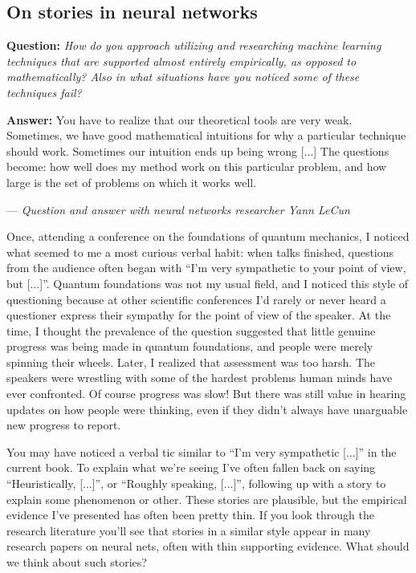 \documentclass[a4paper,twoside,10pt]{book}
\begin{document}
\subsection*{On stories in neural networks}
\begin{adjustwidth}{1.5cm}{0.5cm}
\textbf{Question:} \textit{How do you approach utilizing and researching machine learning techniques that are supported almost entirely empirically, as opposed to mathematically? Also in what situations have you noticed some of these techniques fail?}

\noindent\textbf{Answer:} You have to realize that our theoretical tools are very weak. Sometimes, we have good mathematical intuitions for why a particular technique should work. Sometimes our intuition ends up being wrong [...] The questions become: how well does my method work on this particular problem, and how large is the set of problems on which it works well.

--- \textit{Question and answer with neural networks researcher Yann LeCun}
\end{adjustwidth}
Once, attending a conference on the foundations of quantum mechanics, I noticed what seemed to me a most curious verbal habit: when talks finished, questions from the audience often began with ``I'm very sympathetic to your point of view, but [...]''. Quantum foundations was not my usual field, and I noticed this style of questioning because at other scientific conferences I'd rarely or never heard a questioner express their sympathy for the point of view of the speaker. At the time, I thought the prevalence of the question suggested that little genuine progress was being made in quantum foundations, and people were merely spinning their wheels. Later, I realized that assessment was too harsh. The speakers were wrestling with some of the hardest problems human minds have ever confronted. Of course progress was slow! But there was still value in hearing updates on how people were thinking, even if they didn't always have unarguable new progress to report.

You may have noticed a verbal tic similar to ``I'm very sympathetic [...]'' in the current book. To explain what we're seeing I've often fallen back on saying ``Heuristically, [...]'', or ``Roughly speaking, [...]'', following up with a story to explain some phenomenon or other. These stories are plausible, but the empirical evidence I've presented has often been pretty thin. If you look through the research literature you'll see that stories in a similar style appear in many research papers on neural nets, often with thin supporting evidence. What should we think about such stories?
\end{document}
